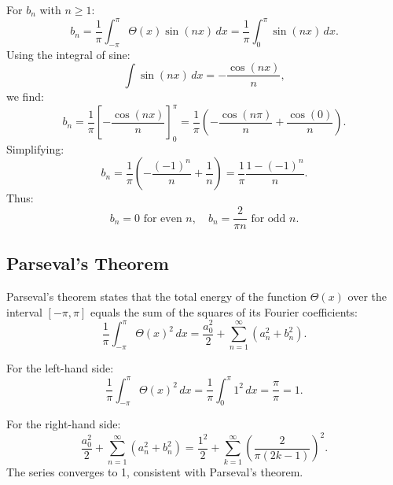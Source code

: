 For \( b_n \) with \( n \geq 1 \):
\begin{equation}
b_n = \frac{1}{\pi} \int_{-\pi}^\pi \Theta(x) \sin(nx) \, dx = \frac{1}{\pi} \int_0^\pi \sin(nx) \, dx.
\label{eq:bn-step}
\end{equation}
Using the integral of sine:
\begin{equation}
\int \sin(nx) \, dx = -\frac{\cos(nx)}{n},
\label{eq:sine-integral}
\end{equation}
we find:
\begin{equation}
b_n = \frac{1}{\pi} \left[ -\frac{\cos(nx)}{n} \right]_0^\pi = \frac{1}{\pi} \left( -\frac{\cos(n\pi)}{n} + \frac{\cos(0)}{n} \right).
\label{eq:bn-calculation}
\end{equation}
Simplifying:
\begin{equation}
b_n = \frac{1}{\pi} \left( -\frac{(-1)^n}{n} + \frac{1}{n} \right) = \frac{1}{\pi} \frac{1 - (-1)^n}{n}.
\label{eq:bn-result}
\end{equation}
Thus:
\begin{equation}
b_n = 0 \text{ for even } n, \quad b_n = \frac{2}{\pi n} \text{ for odd } n.
\label{eq:bn-odd-even}
\end{equation}

\subsection{Parseval's Theorem}

Parseval's theorem states that the total energy of the function \( \Theta(x) \) over the interval \( [-\pi, \pi] \) equals the sum of the squares of its Fourier coefficients:
\begin{equation}
\frac{1}{\pi} \int_{-\pi}^\pi \Theta(x)^2 \, dx = \frac{a_0^2}{2} + \sum_{n=1}^\infty \left(a_n^2 + b_n^2\right).
\label{eq:parseval}
\end{equation}

For the left-hand side:
\begin{equation}
\frac{1}{\pi} \int_{-\pi}^\pi \Theta(x)^2 \, dx = \frac{1}{\pi} \int_0^\pi 1^2 \, dx = \frac{\pi}{\pi} = 1.
\label{eq:parseval-lhs}
\end{equation}

For the right-hand side:
\begin{equation}
\frac{a_0^2}{2} + \sum_{n=1}^\infty \left(a_n^2 + b_n^2\right) = \frac{1^2}{2} + \sum_{k=1}^\infty \left(\frac{2}{\pi(2k-1)}\right)^2.
\label{eq:parseval-rhs}
\end{equation}
The series converges to 1, consistent with Parseval's theorem.

